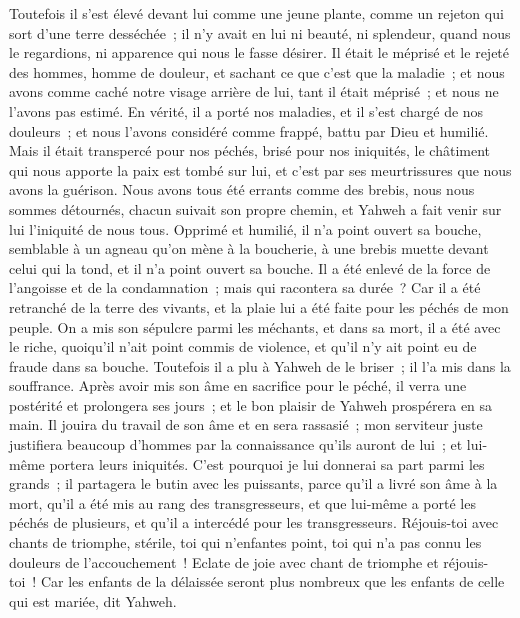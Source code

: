 \begin{multicols}{2}
Toutefois il s'est élevé devant lui comme une jeune plante, comme un rejeton qui sort d'une terre desséchée~; il n'y avait en lui ni beauté, ni splendeur, quand nous le regardions, ni apparence qui nous le fasse désirer.
Il était le méprisé et le rejeté des hommes, homme de douleur, et sachant ce que c'est que la maladie~; et nous avons comme caché notre visage arrière de lui, tant il était méprisé~; et nous ne l'avons pas estimé.
En vérité, il a porté nos maladies, et il s'est chargé de nos douleurs~; et nous l'avons considéré comme frappé, battu par Dieu et humilié.
Mais il était transpercé pour nos péchés, brisé pour nos iniquités, le châtiment qui nous apporte la paix est tombé sur lui, et c'est par ses meurtrissures que nous avons la guérison.
Nous avons tous été errants comme des brebis, nous nous sommes détournés, chacun suivait son propre chemin, et Yahweh a fait venir sur lui l'iniquité de nous tous.
Opprimé et humilié, il n'a point ouvert sa bouche, semblable à un agneau qu'on mène à la boucherie, à une brebis muette devant celui qui la tond, et il n'a point ouvert sa bouche.
Il a été enlevé de la force de l'angoisse et de la condamnation~; mais qui racontera sa durée~? Car il a été retranché de la terre des vivants, et la plaie lui a été faite pour les péchés de mon peuple.
On a mis son sépulcre parmi les méchants, et dans sa mort, il a été avec le riche, quoiqu'il n'ait point commis de violence, et qu'il n'y ait point eu de fraude dans sa bouche.
Toutefois il a plu à Yahweh de le briser~; il l'a mis dans la souffrance. Après avoir mis son âme en sacrifice pour le péché, il verra une postérité et prolongera ses jours~; et le bon plaisir de Yahweh prospérera en sa main.
Il jouira du travail de son âme et en sera rassasié~; mon serviteur juste justifiera beaucoup d'hommes par la connaissance qu'ils auront de lui~; et lui-même portera leurs iniquités.
C'est pourquoi je lui donnerai sa part parmi les grands~; il partagera le butin avec les puissants, parce qu'il a livré son âme à la mort, qu'il a été mis au rang des transgresseurs, et que lui-même a porté les péchés de plusieurs, et qu'il a intercédé pour les transgresseurs.
\VerseOne{}Réjouis-toi avec chants de triomphe, stérile, toi qui n'enfantes point, toi qui n'a pas connu les douleurs de l'accouchement~! Eclate de joie avec chant de triomphe et réjouis-toi~! Car les enfants de la délaissée seront plus nombreux que les enfants de celle qui est mariée, dit Yahweh.

\end{multicols}

